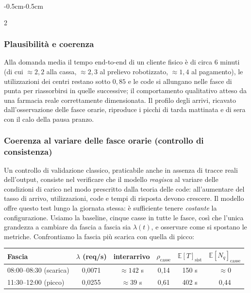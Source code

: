 \documentclass{article}
\begin{document}
\begin{adjustwidth}{-0.5cm}{-0.5cm}
\begin{multicols}{2}
\subsubsection*{Plausibilità e coerenza}
Alla domanda media il tempo end-to-end di un cliente fisico è di circa 6 minuti (di cui
$\approx 2{,}2$ alla cassa, $\approx 2{,}3$ al prelievo robotizzato, $\approx 1{,}4$ al
pagamento), le utilizzazioni dei centri restano sotto $0{,}85$ e le code si allungano nelle fasce
di punta per riassorbirsi in quelle successive; il comportamento qualitativo atteso da una
farmacia reale correttamente dimensionata. Il profilo degli arrivi, ricavato dall'osservazione
delle fasce orarie, riproduce i picchi di tarda mattinata e di sera con il calo della pausa
pranzo.
\end{multicols}
\subsubsection*{Coerenza al variare delle fasce orarie (controllo di consistenza)}
Un controllo di validazione classico, praticabile anche in assenza di tracce reali dell'output,
consiste nel verificare che il modello \emph{reagisca} al variare delle condizioni di carico nel
modo prescritto dalla teoria delle code: all'aumentare del tasso di arrivo, utilizzazioni, code e
tempi di risposta devono crescere. Il modello offre questo
test lungo la giornata stessa: è sufficiente tenere \emph{costante} la configurazione. Usiamo la
baseline, cinque casse in tutte le fasce, così che l'unica grandezza a cambiare da fascia a
fascia sia $\lambda(t)$, e osservare come si spostano le metriche. Confrontiamo la fascia più
scarica con quella di picco:

\begin{center}
\renewcommand{\arraystretch}{1.2}
\begin{tabular}{|l|c|c|c|c|c|}
\hline
\textbf{Fascia} & $\lambda$ (req/s) & interarrivo & $\rho_{\text{casse}}$ &
$\mathbb{E}[T]_{\text{sist}}$ & $\mathbb{E}[N_q]_{\text{casse}}$ \\
\hline
08:00--08:30 (scarica) & 0{,}0071 & $\approx 142$ s & 0{,}14 & 150 s & $\approx 0$ \\
11:30--12:00 (picco)   & 0{,}0255 & $\approx 39$ s  & 0{,}61 & 402 s & 0{,}44 \\
\hline
\end{tabular}
\end{center}


\end{adjustwidth}
\end{document}
